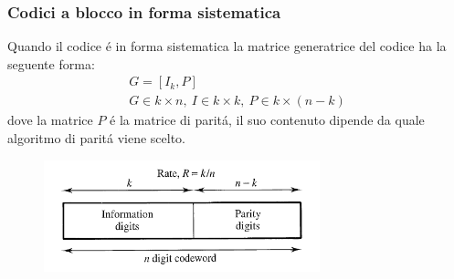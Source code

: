         \subsubsection{Codici a blocco in forma sistematica}
            Quando il codice é in forma sistematica la matrice generatrice del codice ha la seguente forma:
            \begin{gather}
                G = [I_k,P]\nonumber \\
                G\in k\times n,\ I\in k\times k,\ P\in k\times (n-k)\nonumber
            \end{gather}
            dove la matrice $P$ é la matrice di paritá, il suo contenuto dipende da quale algoritmo di paritá viene scelto.
            \begin{figure}[H]
                \centering 
            \label{Def codice forma sistematica}
            \end{figure}
            \begin{figure}[H]
                \centering 
                \includegraphics[width = 8cm]{media/forma sistematica.png}
            \label{matrice forma sistematica}
            \end{figure}
